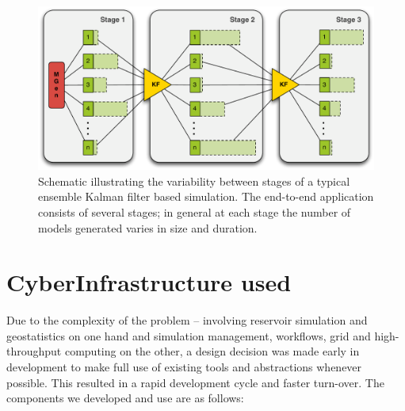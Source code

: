 \documentclass[10pt,conference,final]{IEEEtran}
\begin{document}
\begin{figure}
\begin{center}
\includegraphics*[scale=0.33,angle=0]{figures/3StageKalmanFilter}
\end{center}
\caption{Schematic illustrating the variability between stages of a typical
  ensemble Kalman filter based simulation. The end-to-end
  application consists of several stages; in general at each stage the
  number of models generated varies in size and duration.}
\label{fig:irregular_execution}
\end{figure}

\section*{CyberInfrastructure used}

Due to the complexity of the problem -- involving reservoir simulation and geostatistics on one hand and simulation management, workflows, grid and high-throughput computing on the other, a design decision was made early in development to make full use of existing tools and abstractions whenever possible. This resulted in a rapid development cycle and faster turn-over. The components we developed and use are as follows:
\end{document}

